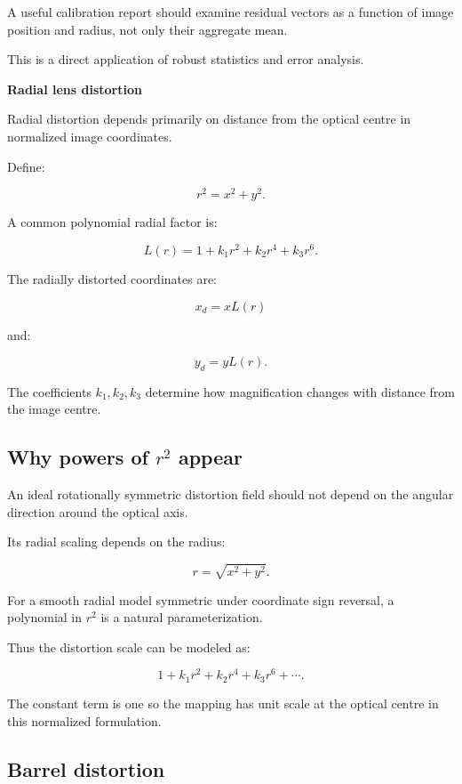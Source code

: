 A useful calibration report should examine residual vectors as a function of image position and radius, not only their aggregate mean.

This is a direct application of robust statistics and error analysis.

\textbf{Radial lens distortion}

Radial distortion depends primarily on distance from the optical centre in normalized image coordinates.

Define:

\[
 \boxed{ r^2=x^2+y^2 }.
\]

A common polynomial radial factor is:

\[
 \boxed{ L(r)= 1+k_1r^2+k_2r^4+k_3r^6 }.
\]

The radially distorted coordinates are:

\[
 \boxed{ x_d=xL(r) }
\]

and:

\[
 \boxed{ y_d=yL(r) }.
\]

The coefficients \(k_1,k_2,k_3\) determine how magnification changes with distance from the image centre.

\subsection{\texorpdfstring{Why powers of \(r^2\) appear}{Why powers of r\^{}2 appear}}\label{02-foundations-ii-ch035-why-powers-of-r2-appear}

An ideal rotationally symmetric distortion field should not depend on the angular direction around the optical axis.

Its radial scaling depends on the radius:

\[
 r=\sqrt{x^2+y^2}.
\]

For a smooth radial model symmetric under coordinate sign reversal, a polynomial in \(r^2\) is a natural parameterization.

Thus the distortion scale can be modeled as:

\[
 1+k_1r^2+k_2r^4+k_3r^6+\cdots.
\]

The constant term is one so the mapping has unit scale at the optical centre in this normalized formulation.

\subsection{Barrel distortion}\label{02-foundations-ii-ch035-barrel-distortion}

